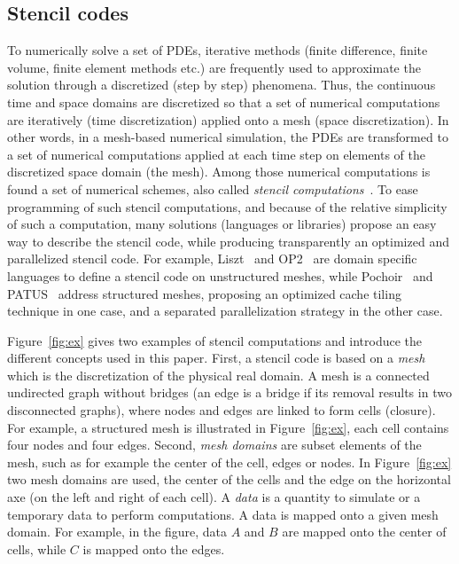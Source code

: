 \subsection{Stencil codes}
\label{sect:stencil}
To numerically solve a set of PDEs, iterative methods (finite difference, finite volume, finite element methods etc.) are frequently used to approximate the solution through a discretized (step by step) phenomena. Thus, the continuous time and space domains are discretized so that a set of numerical computations are iteratively (time discretization) applied onto a mesh (space discretization). In other words, in a mesh-based numerical simulation, the PDEs are transformed to a set of numerical computations applied at each time step on elements of the discretized space domain (the mesh). Among those numerical computations is found a set of numerical schemes, also called \textit{stencil computations}~\cite{spaaTangCKLL11}. To ease programming of such stencil computations, and because of the relative simplicity of such a computation, many solutions (languages or libraries) propose an easy way to describe the stencil code, while producing transparently an optimized and parallelized stencil code. For example, Liszt~\cite{DeVito2011LDS} and OP2~\cite{Giles2011} are domain specific languages to define a stencil code on unstructured meshes, while Pochoir~\cite{spaaTangCKLL11} and PATUS~\cite{citeulike12258902} address structured meshes, proposing an optimized cache tiling technique in one case, and a separated parallelization strategy in the other case.

Figure~\ref{fig:ex} gives two examples of stencil computations and introduce the different concepts used in this paper. First, a stencil code is based on a \emph{mesh} which is the discretization of the physical real domain. A mesh is a connected undirected graph without bridges (an edge is a bridge if its removal results in two disconnected graphs), where nodes and edges are linked to form cells (closure). For example, a structured mesh is illustrated in Figure~\ref{fig:ex}, each cell contains four nodes and four edges. Second, \emph{mesh domains} are subset elements of the mesh, such as for example the center of the cell, edges or nodes. In Figure~\ref{fig:ex} two mesh domains are used, the center of the cells and the edge on the horizontal axe (on the left and right of each cell). A \emph{data} is a quantity to simulate or a temporary data to perform computations. A data is mapped onto a given mesh domain. For example, in the figure, data $A$ and $B$ are mapped onto the center of cells, while $C$ is mapped onto the edges.

